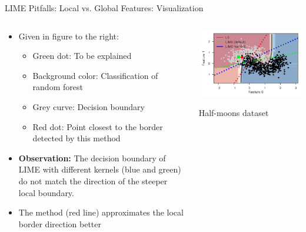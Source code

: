 \documentclass[11pt,compress,t,notes=noshow, aspectratio=169, xcolor=table]{beamer}
\begin{document}
\begin{vbframe}{LIME Pitfalls: Local vs. Global Features: Visualization }

\begin{columns}
	\begin{column}{0.6\textwidth}
		\begin{itemize}
		\item Given in figure to the right:
		\begin{itemize}
		    \item Green dot: To be explained
		    \item Background color: Classification of random forest
		    \item Grey curve: Decision boundary
		    \item Red dot: Point closest to the border detected by this method 
		\end{itemize}
		\item \textbf{Observation: }The decision boundary of LIME with different kernels (blue and green) do not match the direction of the steeper local boundary. 
		\item The method  (red line) approximates the local border direction better 
	\end{itemize}
\end{column}
\begin{column}{0.39\textwidth}
\vspace{0.3cm}

	\begin{center}
	\includegraphics[width=1\textwidth]{figure/lime-globallocal2}
	
	\vspace{-0.3cm}
	{Half-moons dataset}
	
\end{center}

	\end{column}
\end{columns}
\end{vbframe}
\end{document}
